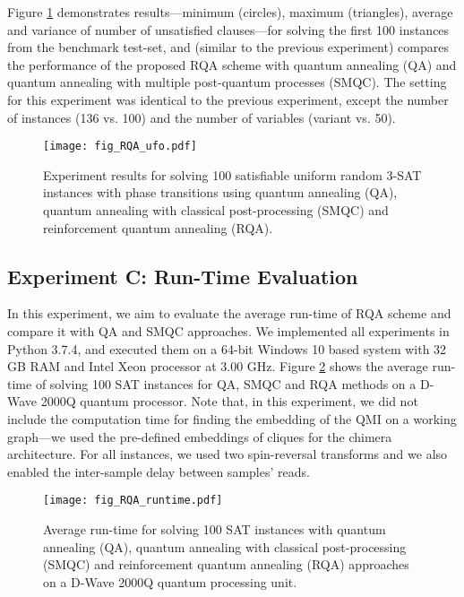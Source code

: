 \documentclass[fleqn,10pt]{wlscirep}
\begin{document}
Figure \ref{fig:RQA_ufo} demonstrates results—minimum (circles), maximum (triangles), average and variance of number of unsatisfied clauses—for solving the first 100 instances from the benchmark test-set, and (similar to the previous experiment) compares the performance of the proposed RQA scheme with quantum annealing (QA) and quantum annealing with multiple post-quantum processes (SMQC). The setting for this experiment was identical to the previous experiment, except the number of instances (136 vs. 100) and the number of variables (variant vs. 50). 
\begin{figure}
	\centering
	\texttt{[image: fig\_RQA\_ufo.pdf]}
	\caption{
Experiment results for solving 100 satisfiable uniform random 3-SAT instances with phase transitions using quantum annealing (QA), quantum annealing with classical post-processing (SMQC) and reinforcement quantum annealing (RQA).
	}
\label{fig:RQA_ufo}
\end{figure}


\subsection*{Experiment C: Run-Time Evaluation}
In this experiment, we aim to evaluate the average run-time of RQA scheme and compare it with QA and SMQC approaches. We implemented all experiments in Python 3.7.4, and executed them on a 64-bit Windows 10 based system with 32 GB RAM and Intel Xeon processor at 3.00 GHz. Figure \ref{fig:RQA_runtime} shows the average run-time of solving 100 SAT instances for QA, SMQC and RQA methods on a D-Wave 2000Q quantum processor. Note that, in this experiment, we did not include the computation time for finding the embedding of the QMI on a working graph—we used the pre-defined embeddings of cliques for the chimera architecture. For all instances, we used two spin-reversal transforms and we also enabled the inter-sample delay between samples’ reads.  
\begin{figure}
	\centering
	\texttt{[image: fig\_RQA\_runtime.pdf]}
	\caption{
	Average run-time for solving 100 SAT instances with quantum annealing (QA), quantum annealing with classical post-processing (SMQC) and reinforcement quantum annealing (RQA) approaches on a D-Wave 2000Q quantum processing unit.
}
\label{fig:RQA_runtime}
\end{figure}
\end{document}
